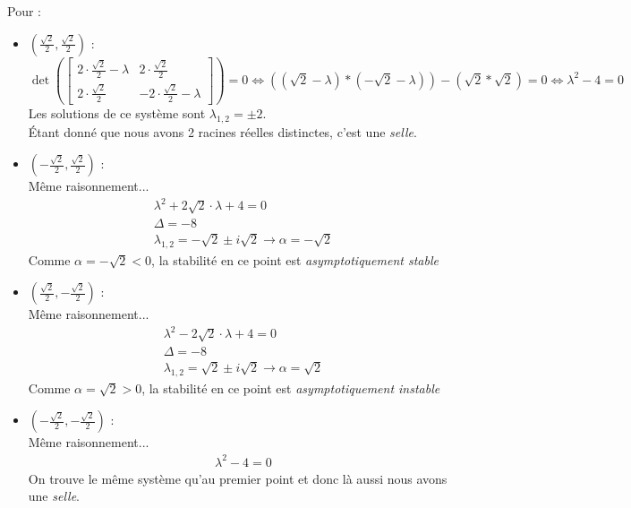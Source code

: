 \documentclass[11pt,a4paper]{report}
\newcommand{\rac}{\ensuremath{\frac{\sqrt{2}}{2}}}
\begin{document}
			Pour : 
			\begin{itemize}
				\item $( \rac , \rac)$	:\\
					\[ \det (
					\begin{bmatrix}
			   		2 \cdot \rac - \lambda & 2\cdot \rac \\
			   		2\cdot \rac & -2\cdot \rac  - \lambda
					\end{bmatrix} ) = 0 \Leftrightarrow((\sqrt{2}- \lambda)* (- \sqrt{2} - \lambda)) - (\sqrt{2}*\sqrt{2}) = 0 \Leftrightarrow \lambda^2 - 4 = 0
					\]	
					Les solutions de ce système sont $\lambda_{1,2} = \pm 2$.\\
					Étant donné que nous avons 2 racines réelles distinctes, c'est une \emph{selle}.\\
				
				\item $( -\rac , \rac)$ : \\				
					Même raisonnement...
					\begin{gather*}
						\lambda^2 + 2\sqrt{2}\cdot\lambda+4 = 0	\\
						\Delta = -8 \\
						\lambda_{1,2} = -\sqrt{2} \pm i\sqrt{2} \rightarrow \alpha = -\sqrt{2}				
					\end{gather*}
					Comme $\alpha = -\sqrt{2} < 0$, la stabilité en ce point est \emph{asymptotiquement stable}\\
					
				\item $( \rac , -\rac)$ : \\				
					Même raisonnement...
					\begin{gather*}
						\lambda^2 - 2\sqrt{2}\cdot\lambda+4 = 0	\\
						\Delta = -8 \\
						\lambda_{1,2} = \sqrt{2} \pm i\sqrt{2} \rightarrow \alpha = \sqrt{2}				
					\end{gather*}
					Comme $\alpha = \sqrt{2} > 0$, la stabilité en ce point est \emph{asymptotiquement instable}\\
				
				\item $( -\rac , -\rac)$ : \\				
					Même raisonnement...
					\begin{gather*}
						\lambda^2 - 4 = 0			
					\end{gather*}
					On trouve le même système qu'au premier point et donc là aussi nous avons une \emph{selle}.
			\end{itemize}
			
\end{document}

